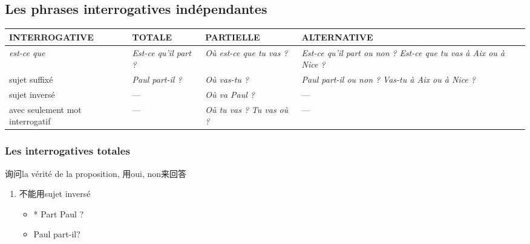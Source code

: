 \documentclass[UTF8]{report}
\begin{document}
\subsection{Les phrases interrogatives indépendantes}
\begin{table}[H]
\centering
\begin{adjustbox}{max width=\textwidth}
\begin{tabular}{|p{}|p{}|p{}|p{}|}
\hline
\rowcolor{cyan!20}
\textbf{INTERROGATIVE} & \textbf{TOTALE} & \textbf{PARTIELLE} & \textbf{ALTERNATIVE} \\
\hline

\textit{est-ce que} &
\textit{Est-ce qu’il part ?} &
\textit{Où est-ce que tu vas ?} &
\textit{Est-ce qu’il part ou non ?} \newline \textit{Est-ce que tu vas à Aix ou à Nice ?} \\
\hline

sujet suffixé &
\textit{Paul part-il ?} &
\textit{Où vas-tu ?} &
\textit{Paul part-il ou non ?} \newline \textit{Vas-tu à Aix ou à Nice ?} \\
\hline

sujet inversé &
--- &
\textit{Où va Paul ?} &
--- \\
\hline

avec seulement mot interrogatif &
--- &
\textit{Où tu vas ?} \newline \textit{Tu vas où ?} &
--- \\
\hline
\end{tabular}
\end{adjustbox}
\end{table}


\subsubsection{Les interrogatives totales}
询问la vérité de la proposition, 用oui, non来回答
\begin{enumerate}
    \item 不能用sujet inversé
    \begin{itemize}
        \item * Part Paul ?
        \item Paul part-il?
    \end{itemize}
\end{enumerate}
\end{document}
